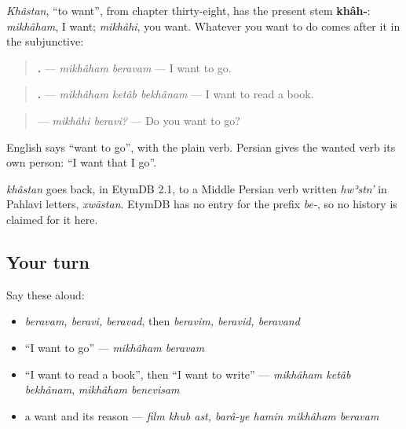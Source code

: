 \begin{grammarlens}[title={Grammar Lens: mikhâham, and the verb after it}]
\emph{Khâstan}, \textquotedblleft{}to want\textquotedblright{}, from chapter thirty-eight, has the present stem \textbf{khâh-}: \emph{mikhâham}, I want; \emph{mikhâhi}, you want. Whatever you want to do comes after it in the subjunctive:

\begin{quote}
\textbf{ .} — \emph{mikhâham beravam} — I want to go.
\end{quote}

\begin{quote}
\textbf{  .} — \emph{mikhâham ketâb bekhânam} — I want to read a book.
\end{quote}

\begin{quote}
\textbf{ } — \emph{mikhâhi beravi?} — Do you want to go?
\end{quote}

English says \textquotedblleft{}want to go\textquotedblright{}, with the plain verb. Persian gives the wanted verb its own person: \textquotedblleft{}I want that I go\textquotedblright{}.
\end{grammarlens}

\begin{cousinweb}
\emph{khâstan} goes back, in EtymDB 2.1, to a Middle Persian verb written \emph{hwʾstn'} in Pahlavi letters, \emph{xwāstan}. EtymDB has no entry for the prefix \emph{be-}, so no history is claimed for it here.
\end{cousinweb}

\subsection*{Your turn}
Say these aloud:

\begin{itemize}
\raggedright
  \item \emph{beravam, beravi, beravad}, then \emph{beravim, beravid, beravand}
  \item \textquotedblleft{}I want to go\textquotedblright{} — \emph{mikhâham beravam}
  \item \textquotedblleft{}I want to read a book\textquotedblright{}, then \textquotedblleft{}I want to write\textquotedblright{} — \emph{mikhâham ketâb bekhânam}, \emph{mikhâham benevisam}
  \item a want and its reason — \emph{film khub ast, barâ-ye hamin mikhâham beravam}
\end{itemize}

